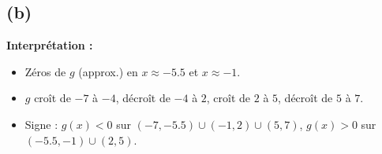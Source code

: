 \documentclass{article}
\theoremstyle{definition}
\begin{document}
\subsection*{(b)}

\noindent\textbf{Interprétation :}
\begin{itemize}
  \item Zéros de $g$ (approx.) en $x\approx -5.5$ et $x\approx -1$.
  \item $g$ croît de $-7$ à $-4$, décroît de $-4$ à $2$, croît de $2$ à $5$, décroît de $5$ à $7$.
  \item Signe : $g(x)<0$ sur $(-7,-5.5)\cup(-1,2)\cup(5,7)$, $g(x)>0$ sur $(-5.5,-1)\cup(2,5)$.
\end{itemize}
\end{document}

